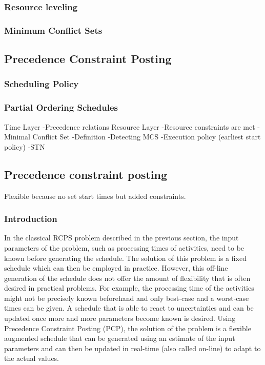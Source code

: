 \documentclass{article}
\begin{document}
\subsubsection{Resource leveling}
\subsubsection{Minimum Conflict Sets}

\subsection{Precedence Constraint Posting}
\subsubsection{Scheduling Policy}
\subsubsection{Partial Ordering Schedules}

Time Layer
-Precedence relations
Resource Layer
-Resource constraints are met
-Minimal Conflict Set
	-Definition
-Detecting MCS
	-Execution policy (earliest start policy)
	-STN

\subsection{Precedence constraint posting}
Flexible because no set start times but added constraints.

\subsubsection{Introduction}
In the classical RCPS problem described in the previous section, the input parameters of the problem, such as processing times of activities, need to be known before generating the schedule. The solution of this problem is a fixed schedule which can then be employed in practice. However, this off-line generation of the schedule does not offer the amount of flexibility that is often desired in practical problems. For example, the processing time of the activities might not be precisely known beforehand and only best-case and a worst-case times can be given. A schedule that is able to react to uncertainties and can be updated once more and more parameters become known is desired. Using Precedence Constraint Posting (PCP), the solution of the problem is a flexible augmented schedule that can be generated using an estimate of the input parameters and can then be updated in real-time (also called on-line) to adapt to the actual values.
\end{document}
